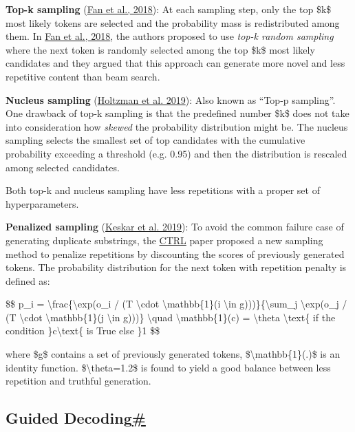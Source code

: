\textbf{Top-k sampling} (\href{https://arxiv.org/abs/1805.04833}{Fan et al., 2018}): At each sampling step, only the top \$k\$ most likely tokens are selected and the probability mass is redistributed among them. In \href{https://arxiv.org/abs/1805.04833}{Fan et al., 2018}, the authors proposed to use \emph{top-k random sampling} where the next token is randomly selected among the top \$k\$ most likely candidates and they argued that this approach can generate more novel and less repetitive content than beam search.

\label{nucleus}{}\textbf{Nucleus sampling} (\href{https://arxiv.org/abs/1904.09751}{Holtzman et al. 2019}): Also known as ``Top-p sampling''. One drawback of top-k sampling is that the predefined number \$k\$ does not take into consideration how \emph{skewed} the probability distribution might be. The nucleus sampling selects the smallest set of top candidates with the cumulative probability exceeding a threshold (e.g. 0.95) and then the distribution is rescaled among selected candidates.

Both top-k and nucleus sampling have less repetitions with a proper set of hyperparameters.

\textbf{Penalized sampling} (\href{https://arxiv.org/abs/1909.05858}{Keskar et al. 2019}): To avoid the common failure case of generating duplicate substrings, the \href{https://arxiv.org/abs/1909.05858}{CTRL} paper proposed a new sampling method to penalize repetitions by discounting the scores of previously generated tokens. The probability distribution for the next token with repetition penalty is defined as:

\$\$ p\_i = \textbackslash frac\{\textbackslash exp(o\_i / (T \textbackslash cdot \textbackslash mathbb\{1\}(i \textbackslash in g)))\}\{\textbackslash sum\_j \textbackslash exp(o\_j / (T \textbackslash cdot \textbackslash mathbb\{1\}(j \textbackslash in g)))\} \textbackslash quad \textbackslash mathbb\{1\}(c) = \textbackslash theta \textbackslash text\{ if the condition \}c\textbackslash text\{ is True else \}1 \$\$

where \$g\$ contains a set of previously generated tokens, \$\textbackslash mathbb\{1\}(.)\$ is an identity function. \$\textbackslash theta=1.2\$ is found to yield a good balance between less repetition and truthful generation.

\subsection{\texorpdfstring{Guided Decoding\hyperref[guided-decoding]{\#}}{Guided Decoding\#}}\label{guided-decoding}

